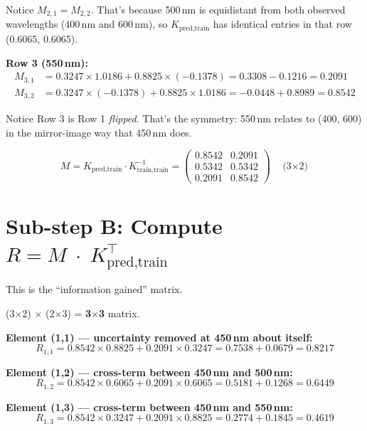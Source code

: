 \documentclass[11pt, a4paper]{article}
\newcommand{\gut}[1]{\begin{tcolorbox}[colback=lightyellow, colframe=orange!50, title=Gut feeling]#1\end{tcolorbox}}
\begin{document}
\gut{
Notice $M_{2,1} = M_{2,2}$. That's because 500\,nm is equidistant from both observed wavelengths (400\,nm and 600\,nm), so $K_{\text{pred,train}}$ has identical entries in that row (0.6065, 0.6065).
}

\textbf{Row 3 (550\,nm):}
\begin{align}
M_{3,1} &= 0.3247 \times 1.0186 + 0.8825 \times (-0.1378) = 0.3308 - 0.1216 = \mathbf{0.2091} \tag{S6-8a} \\
M_{3,2} &= 0.3247 \times (-0.1378) + 0.8825 \times 1.0186 = -0.0448 + 0.8989 = \mathbf{0.8542} \tag{S6-8b}
\end{align}

\gut{
Notice Row 3 is Row 1 \emph{flipped}. That's the symmetry: 550\,nm relates to (400, 600) in the mirror-image way that 450\,nm does.
}

\begin{equation}
M = K_{\text{pred,train}} \cdot K_{\text{train,train}}^{-1} =
\begin{pmatrix}
0.8542 & 0.2091 \\
0.5342 & 0.5342 \\
0.2091 & 0.8542
\end{pmatrix}
\quad \text{(3$\times$2)}
\tag{S6-9}
\end{equation}


\section*{\color{secblue}Sub-step B: Compute $R = M \;\cdot\; K_{\text{pred,train}}^\top$}

This is the ``information gained'' matrix.

(3$\times$2) $\times$ (2$\times$3) = \textbf{3$\times$3} matrix.

\bigskip
\textbf{Element (1,1) --- uncertainty removed at 450\,nm about itself:}
\begin{equation}
R_{1,1} = 0.8542 \times 0.8825 + 0.2091 \times 0.3247 = 0.7538 + 0.0679 = \mathbf{0.8217}
\tag{S6-10}
\end{equation}

\textbf{Element (1,2) --- cross-term between 450\,nm and 500\,nm:}
\begin{equation}
R_{1,2} = 0.8542 \times 0.6065 + 0.2091 \times 0.6065 = 0.5181 + 0.1268 = \mathbf{0.6449}
\tag{S6-11}
\end{equation}

\textbf{Element (1,3) --- cross-term between 450\,nm and 550\,nm:}
\begin{equation}
R_{1,3} = 0.8542 \times 0.3247 + 0.2091 \times 0.8825 = 0.2774 + 0.1845 = \mathbf{0.4619}
\tag{S6-12}
\end{equation}
\end{document}

